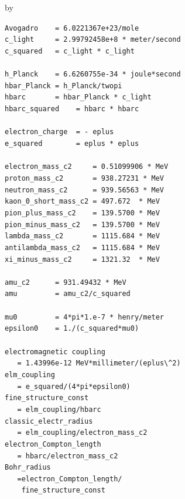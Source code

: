 \documentclass[twoside]{article}
\newcommand{\entrylabel}[1]{\mbox{\textbf{{#1}}}\hfil}%
\newenvironment{entry}
{\begin{list}{}%
    {\renewcommand{\makelabel}{\entrylabel}%
     \setlength{\labelwidth}{90pt}%
     \setlength{\leftmargin}{\labelwidth}
     \advance\leftmargin by \labelsep%
      }%
    }%
  {\end{list}}
\newcommand{\Entrylabel}[1]%
{\raisebox{0pt}[1ex][0pt]{\makebox[\labelwidth][l]%
    {\parbox[t]{\labelwidth}{\hspace{0pt}\textbf{{#1}}}}}}
\newenvironment{Entry}%
{\renewcommand{\entrylabel}{\Entrylabel}\begin{entry}}%
  {\end{entry}}
\begin{document}
\begin{description}
\begin{Entry}
  \verb#Avogadro    = 6.0221367e+23/mole# \\
  \verb#c_light     = 2.99792458e+8 * meter/second#\\      
  \verb+c_squared   = c_light * c_light+\\ \\
  \verb+h_Planck    = 6.6260755e-34 * joule*second+\\
  \verb+hbar_Planck = h_Planck/twopi+\\
  \verb+hbarc       = hbar_Planck * c_light+\\
  \verb+hbarc_squared    = hbarc * hbarc+\\ \\
  \verb+electron_charge  = - eplus+ \\            
  \verb+e_squared        = eplus * eplus+\\ \\
  \verb+electron_mass_c2     = 0.51099906 * MeV+\\  
  \verb+proton_mass_c2       = 938.27231 * MeV+\\
  \verb+neutron_mass_c2      = 939.56563 * MeV+\\
  \verb+kaon_0_short_mass_c2 = 497.672  * MeV+\\
  \verb+pion_plus_mass_c2    = 139.5700 * MeV+\\
  \verb+pion_minus_mass_c2   = 139.5700 * MeV+\\
  \verb+lambda_mass_c2       = 1115.684 * MeV+\\
  \verb+antilambda_mass_c2   = 1115.684 * MeV+\\
  \verb+xi_minus_mass_c2     = 1321.32  * MeV+\\ \\
  \verb+amu_c2      = 931.49432 * MeV+ \\
  \verb+amu         = amu_c2/c_squared+ \\ \\
  \verb+mu0         = 4*pi*1.e-7 * henry/meter+ \\
  \verb+epsilon0    = 1./(c_squared*mu0)+ \\ \\
  \verb+electromagnetic coupling+ \\
  \verb+   = 1.43996e-12 MeV*millimeter/(eplus\^2)+ \\
  \verb+elm_coupling+ \\
  \verb+   = e_squared/(4*pi*epsilon0)+ \\
  \verb+fine_structure_const +\\
  \verb+   = elm_coupling/hbarc+ \\
  \verb+classic_electr_radius+ \\
  \verb+   = elm_coupling/electron_mass_c2+ \\
  \verb+electron_Compton_length +\\
  \verb+   = hbarc/electron_mass_c2+ \\
  \verb+Bohr_radius+ \\
  \verb+   =electron_Compton_length/+ \\
  \verb+    fine_structure_const+ \\ 
  

\end{Entry}
\end{description}
\end{document}
